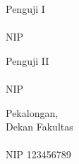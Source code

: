 %

\begin{center}
\begin{multicols}{2}
Penguji I\\[3em]
\underline{\bo{\pengujiSatu}}\\[-0.6em]
NIP \nipPengujiSatu

Penguji II\\[3em]
\underline{\bo{\pengujiDua}}\\[-0.6em]
NIP \nipPengujiDua
\end{multicols}

Pekalongan, \tanggalLulus\\[-0.6em]
Dekan Fakultas \fakultas\\[3em]

\underline{}\\[-0.6em]
NIP 123456789
\end{center}


\newpage
